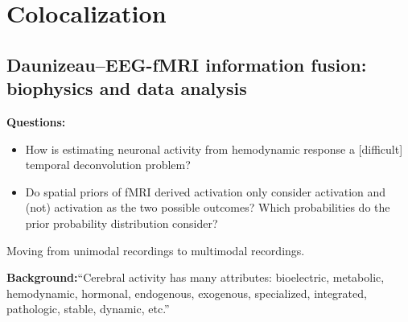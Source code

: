 \documentclass{article}
\begin{document}
    \section{Colocalization} 
        \subsection{Daunizeau--EEG-fMRI information fusion: biophysics and data 
    analysis}
            \textbf{Questions:}
            \begin{itemize}
                \item How is estimating neuronal activity from hemodynamic
response a [difficult] temporal deconvolution problem?
                \item Do spatial priors of fMRI derived activation only consider
activation and (not) activation as the two possible outcomes? Which
probabilities do the prior probability distribution consider?
            \end{itemize}     
            Moving from unimodal recordings to multimodal recordings. 

            \textbf{Background:}``Cerebral activity has many attributes: bioelectric,
            metabolic, hemodynamic, hormonal, endogenous, exogenous, specialized, 
    integrated,
            pathologic, stable, dynamic, etc.'' 
\end{document}
